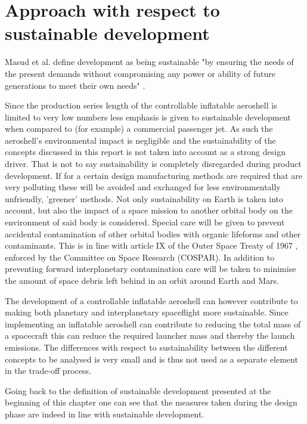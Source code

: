 \section{Approach with respect to sustainable development}
\label{ch:sustain}
Masud et al. define development as being sustainable "by ensuring the needs of the present demands without compromising any power or ability of future generations to meet their own needs" \cite{Masud2011}.

Since the production series length of the controllable inflatable aeroshell is limited to very low numbers less emphasis is given to sustainable development when compared to (for example) a commercial passenger jet. As such the aeroshell's environmental impact is negligible and the sustainability of the concepts discussed in this report is not taken into account as a strong design driver. That is not to say sustainability is completely disregarded during product development. If for a certain design manufacturing methods are required that are very polluting these will be avoided and exchanged for less environmentally unfriendly, 'greener' methods. 
Not only sustainability on Earth is taken into account, but also the impact of a space mission to another orbital body on the environment of said body is considered. Special care will be given to prevent accidental contamination of other orbital bodies with organic lifeforms and other contaminants. This is in line with article IX of the Outer Space Treaty of 1967 \cite{UnitedNations2008}, enforced by the Committee on Space Research (COSPAR). In addition to preventing forward interplanetary contamination care will be taken to minimise the amount of space debris left behind in an orbit around Earth and Mars. 

The development of a controllable inflatable aeroshell can however contribute to making both planetary and interplanetary spaceflight more sustainable. Since implementing an inflatable aeroshell can contribute to reducing the total mass of a spacecraft this can reduce the required launcher mass and thereby the launch emissions. The differences with respect to sustainability between the different concepts to be analysed is very small and is thus not used as a separate element in the trade-off process.

Going back to the definition of sustainable development presented at the beginning of this chapter one can see that the measures taken during the design phase are indeed in line with sustainable development.